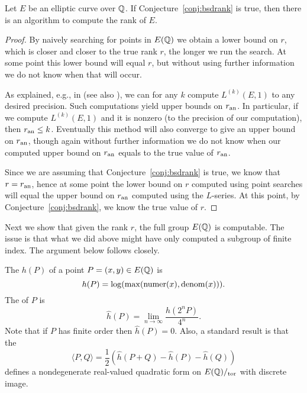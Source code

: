  \begin{proposition}\label{prop:bsdalgrank}
Let $E$ be an elliptic curve over $\mathbb{Q}$. 
 If Conjecture~\ref{conj:bsdrank} is true, then 
there is an algorithm to compute the rank of $E$.
 \end{proposition}
 \begin{proof}
   By naively searching for points in $E(\mathbb{Q})$ we obtain a lower bound
   on $r$, which is closer and closer to the true rank $r$, the longer
   we run the search.  At some point this lower bound will equal $r$,
   but without using further information we do not know when that will
   occur.  

   As explained, e.g., in \cite{cremona:algs} (see also
   \cite{dokchitser:lfun}), we can for any $k$ compute
   $L^{(k)}(E,1)$ to any desired precision.  Such computations yield
   upper bounds on $r_{{\rm an}}$.  In particular, if we compute
   $L^{(k)}(E,1)$ and it is nonzero (to the precision of our
   computation), then $r_{{\rm an}} \leq k$.  Eventually this method will
   also converge to give an upper bound on $r_{{\rm an}}$, though again
   without further information we do not know when our computed upper
   bound on $r_{{\rm an}}$ equals to the true value of $r_{{\rm an}}$.  

   Since we are assuming that Conjecture~\ref{conj:bsdrank} is true, we know
   that $r = r_{{\rm an}}$, hence at some point the lower bound on $r$
   computed using point searches will equal the upper bound on
   $r_{{\rm an}}$ computed using the $L$-series.  At this point, by
   Conjecture~\ref{conj:bsdrank}, we know the true value of $r$.  
   \end{proof}

Next we show that given the rank $r$, the
full group $E(\mathbb{Q})$ is computable.  The issue is that
what we did above might have only computed a subgroup
of finite index.  The argument below follows
\cite[\S3.5]{cremona:algs} closely.

The  $h(P)$ of a point $P =(x,y) \in E(\mathbb{Q})$
is $$h(P) = \log(\max(\operatorname{numer}(x),\operatorname{denom}(x))).$$ The  of $P$ is 
$$
  \hat{h}(P) = \lim_{n\to\infty} \frac{h(2^n P)}{4^n}.
$$
Note that if $P$ has finite order then $\hat{h}(P)=0$.
Also, a standard result  is 
 that the 
$$
\langle P,Q\rangle =  \frac{1}{2}\left( \hat{h}(P+Q) - \hat{h}(P) - \hat{h}(Q)\right)
$$
defines a nondegenerate real-valued quadratic form on $E(\mathbb{Q})/_{\operatorname{tor}}$
with discrete image.

